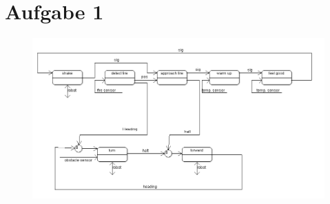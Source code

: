 \documentclass{../Vorlage/mat}
\begin{document}
 \\

\section*{Aufgabe 1}
\begin{figure}[h!]
\centering
\includegraphics[width=\linewidth]{aufgabe1}
\label{fig:aufgabe1}
\end{figure}
\end{document}
